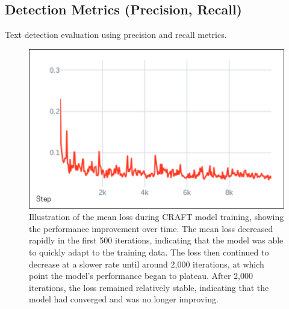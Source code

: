 \subsection{Detection Metrics (Precision, Recall)}
\label{subsec:detection-metrics}
Text detection evaluation using precision and recall metrics.

\begin{figure}[ht]
    \centering
    \includegraphics[width=\textwidth]{figures/mean_loss_craft.png}
    \caption{Illustration of the mean loss during CRAFT model training, showing the performance 
    improvement over time. The mean loss decreased rapidly in the first 500 iterations, 
    indicating that the model was able to quickly adapt to the training data. The loss then 
    continued to decrease at a slower rate until around 2,000 iterations, at which point 
    the model's performance began to plateau. After 2,000 iterations, the loss remained 
    relatively stable, indicating that the model had converged and was no longer improving.}
    \label{fig:mean-loss-craft}
\end{figure}


